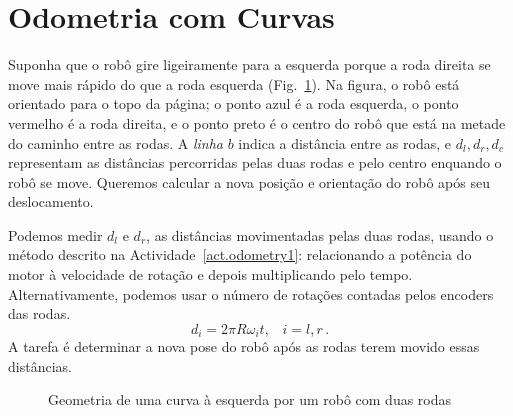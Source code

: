 \section{Odometria com Curvas}\label{s.odometry-turns}

Suponha que o robô gire ligeiramente para a esquerda porque a roda direita se move mais rápido do que a roda esquerda (Fig.~\ref{fig.small-turn}). Na figura, o robô está orientado para o topo da página; o ponto azul é a roda esquerda, o ponto vermelho é a roda direita, e o ponto preto é o centro do robô que está na metade do caminho entre as rodas. A \textit{linha} $b$ indica a distância entre as rodas, e $d_l, d_r, d_c$ representam as distâncias percorridas pelas duas rodas e pelo centro enquando o robô se move. Queremos calcular a nova posição e orientação do robô após seu deslocamento.

Podemos medir $d_l$ e $d_r$, as distâncias movimentadas pelas duas rodas, usando o método descrito na Actividade~\ref{act.odometry1}: relacionando a potência do motor à velocidade de rotação e depois multiplicando pelo tempo. Alternativamente, podemos usar o número de rotações contadas pelos encoders das rodas. 
\begin{equation}
d_i=2\pi R \omega_i t,\;\;\; i=l,r\,. \label{eq.rotation}
\end{equation}
A tarefa é determinar a nova pose do robô após as rodas terem movido essas distâncias.

\begin{figure}
\begin{center}
\end{center}
\caption{Geometria de uma curva à esquerda por um robô com duas rodas}\label{fig.small-turn}
\end{figure}

